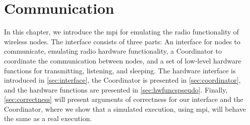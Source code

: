 \chapter{Communication}\label{ch:communication}
In this chapter, we introduce the \acrfull{mpi} for emulating the radio functionality of wireless nodes. The
interface consists of three parts: An interface for nodes to communicate, emulating radio hardware
functionality, a Coordinator to coordinate the communication between nodes, and a set of low-level hardware
functions for transmitting, listening, and sleeping. The hardware interface is introduced in
\autoref{sec:interface}, the Coordinator is presented in \autoref{sec:coordinator}, and the hardware functions
are presented in \autoref{sec:hwfuncspseudo}. Finally, \autoref{sec:correctness} will present arguments of
correctness for our interface and the Coordinator, where we show that a simulated execution, using \gls{mpi},
will behave the same as a real execution.




